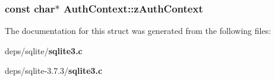 \subsubsection{\setlength{\rightskip}{0pt plus 5cm}const char$\ast$ \bf{Auth\-Context::z\-Auth\-Context}}\label{structAuthContext_f498609343838f7fab86a04a574a3cd8}




The documentation for this struct was generated from the following files:\begin{CompactItemize}
\item 
deps/sqlite/\bf{sqlite3.c}\item 
deps/sqlite-3.7.3/\bf{sqlite3.c}\end{CompactItemize}
